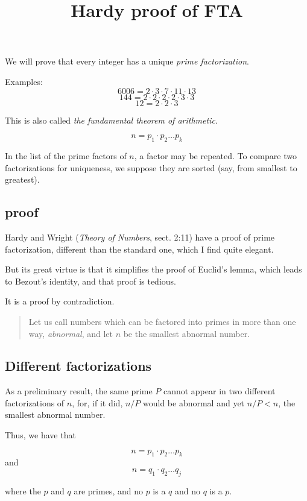 \documentclass[11pt, oneside]{article}
\title{Hardy proof of FTA}
\date{}
\begin{document}
\maketitle
\Large

We will prove that every integer has a unique \emph{prime factorization}.  

Examples:
\[ 6006 = 2 \cdot 3 \cdot 7 \cdot 11 \cdot 13 \]
\[ 144 = 2 \cdot 2 \cdot 2 \cdot 2 \cdot 3 \cdot 3 \]
\[ 12 = 2 \cdot 2 \cdot 3 \]

This is also called \emph{the fundamental theorem of arithmetic}.

\[ n = p_1 \cdot p_2 \dots p_k \]

In the list of the prime factors of $n$, a factor may be repeated.  To compare two factorizations for uniqueness, we suppose they are sorted (say, from smallest to greatest).

\subsection*{proof}

Hardy and Wright (\emph{Theory of Numbers}, sect. 2:11) have a proof of prime factorization, different than the standard one, which I find quite elegant.

But its great virtue is that it simplifies the proof of Euclid's lemma, which leads to Bezout's identity, and that proof is tedious.

It is a proof by contradiction.

\begin{quote}Let us call numbers which can be factored into primes in more than one way, \emph{abnormal}, and let $n$ be the smallest abnormal number.\end{quote}

\subsection*{Different factorizations}

As a preliminary result, the same prime $P$ cannot appear in two different factorizations of $n$, for, if it did, $n/P$ would be abnormal and yet $n/P < n$, the smallest abnormal number.

Thus, we have that

\[ n = p_1 \cdot p_2 \dots p_k \]
and
\[ n = q_1 \cdot q_2 \dots q_j \]
    
where the $p$ and $q$ are primes, and no $p$ is a $q$ and no $q$ is a $p$.
\end{document}
